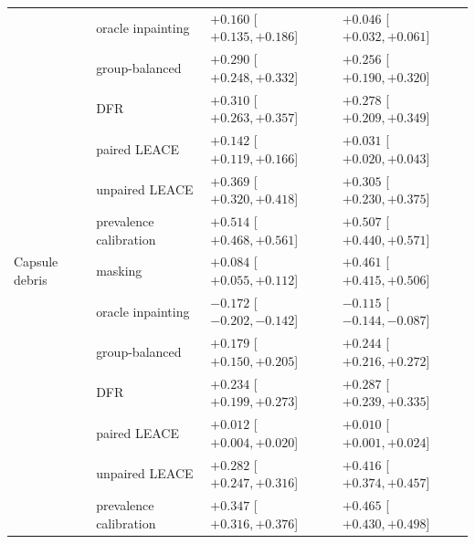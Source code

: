 {\begin{longtable}{p{2.6cm}p{3.4cm}p{4.0cm}p{4.0cm}}
 & oracle inpainting & $+0.160$ [$+0.135, +0.186$] & $+0.046$ [$+0.032, +0.061$] \\
 & group-balanced & $+0.290$ [$+0.248, +0.332$] & $+0.256$ [$+0.190, +0.320$] \\
 & DFR & $+0.310$ [$+0.263, +0.357$] & $+0.278$ [$+0.209, +0.349$] \\
 & paired LEACE & $+0.142$ [$+0.119, +0.166$] & $+0.031$ [$+0.020, +0.043$] \\
 & unpaired LEACE & $+0.369$ [$+0.320, +0.418$] & $+0.305$ [$+0.230, +0.375$] \\
 & prevalence calibration & $+0.514$ [$+0.468, +0.561$] & $+0.507$ [$+0.440, +0.571$] \\
Capsule debris & masking & $+0.084$ [$+0.055, +0.112$] & $+0.461$ [$+0.415, +0.506$] \\
 & oracle inpainting & $-0.172$ [$-0.202, -0.142$] & $-0.115$ [$-0.144, -0.087$] \\
 & group-balanced & $+0.179$ [$+0.150, +0.205$] & $+0.244$ [$+0.216, +0.272$] \\
 & DFR & $+0.234$ [$+0.199, +0.273$] & $+0.287$ [$+0.239, +0.335$] \\
 & paired LEACE & $+0.012$ [$+0.004, +0.020$] & $+0.010$ [$+0.001, +0.024$] \\
 & unpaired LEACE & $+0.282$ [$+0.247, +0.316$] & $+0.416$ [$+0.374, +0.457$] \\
 & prevalence calibration & $+0.347$ [$+0.316, +0.376$] & $+0.465$ [$+0.430, +0.498$] \\
\end{longtable}}
